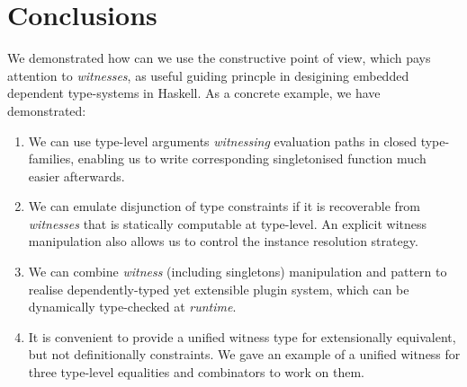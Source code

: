 \documentclass[demotion-paper.tex]{subfiles}
\begin{document}
\section{Conclusions}
\label{sec:concl}
We demonstrated how can we use the constructive point of view, which pays attention to \emph{witnesses}, as useful guiding princple in desigining embedded dependent type-systems in Haskell.
As a concrete example, we have demonstrated:
\begin{enumerate}
  \item We can use type-level arguments \emph{witnessing} evaluation paths in closed type-families, enabling us to write corresponding singletonised function much easier afterwards.
  \item We can emulate disjunction of type constraints if it is recoverable from \emph{witnesses} that is statically computable at type-level. An explicit witness manipulation also allows us to control the instance resolution strategy.
  \item We can combine \emph{witness} (including singletons) manipulation and  pattern to realise dependently-typed yet extensible plugin system, which can be dynamically type-checked at \emph{runtime}.
  \item It is convenient to provide a unified witness type for extensionally equivalent, but not definitionally constraints.
  We gave an example of a unified witness for three type-level equalities and combinators to work on them.
\end{enumerate}

\end{document}
